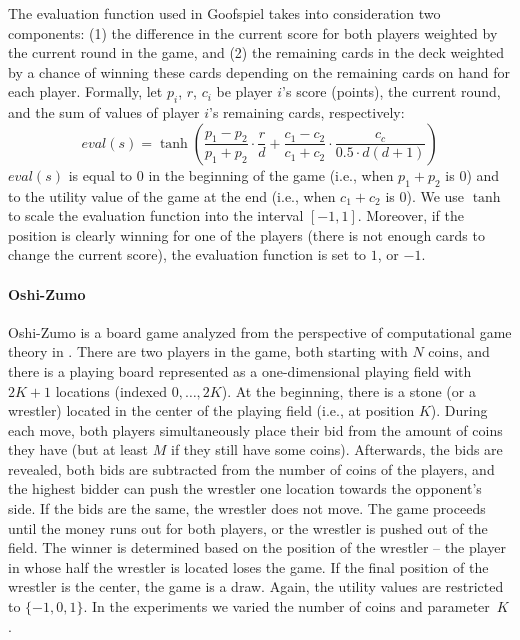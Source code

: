 The evaluation function used in Goofspiel takes into consideration two components: (1) the difference in the current score for both players weighted by the current round in the game, and (2) the remaining cards in the deck weighted by a chance of winning these cards depending on the remaining cards on hand for each player. Formally, let $p_i$, $r$, $c_i$ be player $i$'s score (points), the current round, and the sum of values of player $i$'s remaining cards, respectively:
$$
eval(s) = \tanh\left(\frac{p_1 - p_2}{p_1 + p_2}\cdot\frac{r}{d} + \frac{c_1 - c_2}{c_1 + c_2}\cdot\frac{c_c}{0.5 \cdot d(d+1)}\right)
$$
$eval(s)$ is equal to $0$ in the beginning of the game (i.e., when $p_1 + p_2$ is $0$) and to the utility value of the game at the end (i.e., when $c_1 + c_2$ is $0$). We use $\tanh$ to scale the evaluation function into the interval $[-1,1]$.
Moreover, if the position is clearly winning for one of the players (there is not enough cards to change the current score), the evaluation function is set to $1$, or $-1$.

\paragraph{\textbf{Oshi-Zumo}}

Oshi-Zumo is a board game analyzed from the perspective of computational game theory in \cite{buro2003}.
There are two players in the game, both starting with $N$ coins, and there is a playing board represented as a one-dimensional playing field with $2K+1$ locations (indexed $0, \ldots, 2K$).
At the beginning, there is a stone (or a wrestler) located in the center of the playing field (i.e., at position $K$).
During each move, both players simultaneously place their bid from the amount of coins they have (but at least $M$ if they still have some coins).
Afterwards, the bids are revealed, both bids are subtracted from the number of coins of the players, and the highest bidder can push the wrestler one location towards the opponent's side.
If the bids are the same, the wrestler does not move. 
The game proceeds until the money runs out for both players, or the wrestler is pushed out of the field. 
The winner is determined based on the position of the wrestler -- the player in whose half the wrestler is located loses the game. 
If the final position of the wrestler is the center, the game is a draw.
Again, the utility values are restricted to $\lbrace -1, 0, 1 \rbrace$.
In the experiments we varied the number of coins and parameter~$K$.

